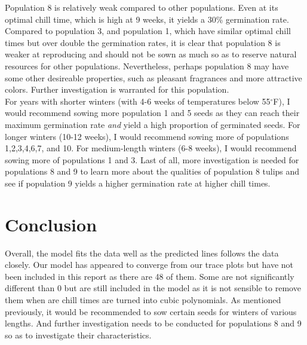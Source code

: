 \documentclass[mathserif]{article}
\begin{document}
\noindent
Population 8 is relatively weak compared to other populations. Even at its optimal chill
time, which is high at 9 weeks, it yields a 30\% germination rate. Compared to population 3,
and population 1, which have similar optimal chill times but over double the germination
rates, it is clear that population 8 is weaker at reproducing and should not be sown as much
so as to reserve natural resources for other populations. Nevertheless, perhaps population
8 may have some other desireable properties, such as pleasant fragrances and more attractive
colors. Further investigation is warranted for this population.\\

\noindent 
For years with shorter winters (with 4-6 weeks of temperatures below 55$^\circ$F), I would
recommend sowing more population 1 and 5 seeds as they can reach their maximum germination rate
\textit{and} yield a high proportion of germinated seeds. For longer winters (10-12 weeks), 
I would recommend sowing more of populations 1,2,3,4,6,7, and 10. For medium-length winters
(6-8 weeks), I would recommend sowing more of populations 1 and 3. Last of all, more investigation
is needed for populations 8 and 9 to learn more about the qualities of population 8 tulips and
see if population 9 yields a higher germination rate at higher chill times.\\


\section*{Conclusion}
Overall, the model fits the data well as the predicted lines follows the 
data closely. Our model has appeared to converge from our trace plots
but have not been included in this report as there are 48 of them. Some
are not significantly different than 0 but are still included in the model
as it is not sensible to remove them when are chill times are turned
into cubic polynomials. As mentioned previously, it would be recommended
to sow certain seeds for winters of various lengths. And further investigation
needs to be conducted for populations 8 and 9 so as to investigate their
characteristics.
\end{document}
